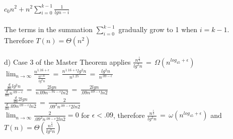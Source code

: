 \documentclass{article}
\begin{document}
$c_0n^2 + n^2\sum_{i=0}^{k-1}\frac{1}{lgn-i}$\\\\
The terms in the summation $\sum_{i=0}^{k-1}$ gradually grow to 1 when $i=k-1$. Therefore $T(n)=\Theta(n^2)$\\\\
d) Case 3 of the Master Theorem applies $\frac{n^\frac{5}{4}}{lg^2n}\,=\,\Omega(n^{log_45+\epsilon})$\\
$\lim_{n \to \infty}\frac{n^{1.16+\epsilon}}{\frac{n^{1.25}}{lg^2n}}\,=\,\frac{n^{1.16+\epsilon}lg^2n}{n^{1.25}}\,=\,\frac{lg^2n}{n^{.09-\epsilon}}$\\
$\frac{\frac{d}{dn}lg^2n}{\frac{d}{dn}n^{.09-\epsilon}}\,=\,\frac{2lgn}{n.09n^{-.91-\epsilon}ln2}\,=\,\frac{2lgn}{.09n^{.09-\epsilon}ln2}$\\
$\frac{\frac{d}{dn}2lgn}{\frac{d}{dn}.09n^{.09-\epsilon}ln2}\,=\,\frac{2}{.09^2n^{.09-\epsilon}2ln2}$\\
$\lim_{n \to \infty}\frac{2}{.09^2n^{.09-\epsilon}2ln2}=0$ for $\epsilon<.09$, therefore $\frac{n^\frac{5}{4}}{lg^2n}\,=\,\omega(n^{log_45+\epsilon})$ and $T(n)=\Theta(\frac{n^\frac{5}{4}}{lg^2n})$\\
\end{document}
